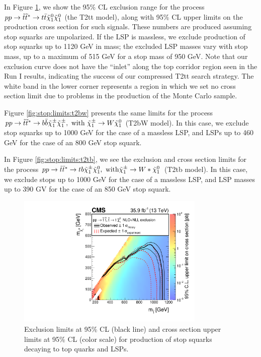 In Figure \ref{fig:stop:limits:t2tt}, we show the 95\% CL exclusion
range for the process $pp \rightarrow \tilde{t}\tilde{t}^* \rightarrow
t\bar{t} \tilde{\chi}^0_1 \tilde{\chi}^0_1$ (the T2tt model), along with 95\% CL upper limits on
the production cross section for such signals. These numbers are
produced assuming stop squarks are unpolarized. If the LSP is
massless, we exclude production of stop squarks up to 1120 GeV in
mass; the excluded LSP masses vary with stop mass, up to a maximum of
515 GeV for a stop mass of 950 GeV. Note that our exclusion curve does
not have the ``inlet'' along the top corridor region seen in the Run I
results, indicating the success of our compressed T2tt search
strategy. The white band in the lower corner represents a region in
which we set no cross section limit due to problems in the
production of the Monte Carlo sample. %

Figure \ref{fig:stop:limits:t2bw} presents the same limits for the
process $pp \rightarrow \tilde{t}\tilde{t}^* \rightarrow b\bar{b}
\tilde{\chi}^\pm_1 \tilde{\chi}^\pm_1,\text{ with } \tilde{\chi}^\pm_1 \rightarrow W
\tilde{\chi}^0_1$ (T2bW model). In this case, we exclude stop squarks up to 1000
GeV for the case of a massless LSP, and LSPs up to 460 GeV for the
case of an 800 GeV stop squark.

In Figure \ref{fig:stop:limits:t2tb}, we see the exclusion and cross
section limits for the process $pp \rightarrow \tilde{t}\tilde{t}^*
\rightarrow tb \tilde{\chi}^\pm_1 \tilde{\chi}^0_1,\text{ with} \tilde{\chi}^\pm_1 \rightarrow
W* \tilde{\chi}^0_1$ (T2tb model). In this case, we exclude stops up to 1000 GeV
for the case of a massless LSP, and LSP masses up to 390 GV for the
case of an 850 GeV stop squark.

\begin{figure}[htbp]
\centering
\includegraphics[width=0.8\textwidth]{figures/limits_T2tt.pdf}
\caption{Exclusion limits at 95\% CL (black line) and cross section
  upper limits at 95\% CL (color scale) for production of stop squarks
  decaying to top quarks and LSPs.}
\label{fig:stop:limits:t2tt}
\end{figure}

